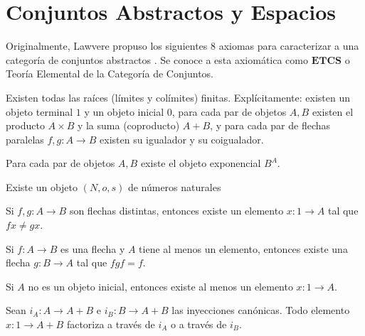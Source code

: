 \chapter{Conjuntos Abstractos y Espacios}
\label{conjuntos}

Originalmente, Lawvere propuso los siguientes $8$ axiomas para caracterizar a una categoría
de conjuntos abstractos \cite{lawvere1964elementary}. Se conoce a esta axiomática como $\textbf{ETCS}$
o Teoría Elemental de la Categoría de Conjuntos.

\begin{axiom}
Existen todas las raíces (límites y colímites) finitas. Explícitamente:
existen un objeto terminal $1$ y un objeto inicial $0$, para cada par de objetos
$A,B$ existen el producto $A\times B$ y la suma (coproducto) $A+B$, y para cada
par de flechas paralelas $f,g\colon A\to B$ existen su igualador y su coigualador.
\end{axiom}

\begin{axiom}[Exponenciación]
Para cada par de objetos $A,B$ existe el objeto exponencial $B^{A}$.
\end{axiom}

\begin{axiom}
Existe un objeto $(N,o,s)$ de números naturales
\end{axiom}

\begin{axiom}[$1$ es un separador]
Si $f,g\colon A\to B$ son flechas distintas, entonces existe un elemento
$x\colon 1\to A$ tal que $fx\neq gx$.
\end{axiom}

\begin{axiom}
Si $f\colon A\to B$ es una flecha y $A$ tiene al menos un elemento, entonces
existe una flecha $g\colon B\to A$ tal que $fgf=f$.
\end{axiom}

\begin{axiom}
Si $A$ no es un objeto inicial, entonces existe al menos un elemento
$x\colon 1\to A$.
\end{axiom}

\begin{axiom}
Sean $i_A\colon A\to A+B$ e $i_B\colon B\to A+B$ las inyecciones canónicas.
Todo elemento $x\colon 1\to A+B$ factoriza a través de $i_A$ o a través de
$i_B$.
\end{axiom}


